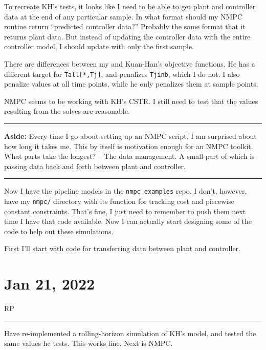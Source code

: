 \documentclass{article}
\newcommand{\RP}{\vspace{0.5cm}RP\vspace{0.2cm}\hrule\vspace{0.2cm}}
\begin{document}
To recreate KH's tests, it looks like I need to be able to get plant
and controller data at the end of any particular sample.
In what format should my NMPC routine return ``predicted controller data?''
Probably the same format that it returns plant data. But instead of updating
the controller data with the entire controller model, I should update
with only the first sample.

\medskip

There are differences between my and Kuan-Han's objective functions.
He has a different target for \texttt{Tall[*,Tj]}, and penalizes
\texttt{Tjinb}, which I do not.
I also penalize values at all time points, while he only penalizes
them at sample points.

\medskip

NMPC seems to be working with KH's CSTR. I still need to test that the values
resulting from the solves are reasonable.

\vspace{0.5cm}\hrule\vspace{0.2cm}

\textbf{Aside:} Every time I go about setting up an NMPC script, I am surprised
about how long it takes me. This by itself is motivation enough for an NMPC
toolkit.
What parts take the longest? -- The data management. A small part of which is
passing data back and forth between plant and controller.

\vspace{0.2cm}\hrule\vspace{0.5cm}

Now I have the pipeline models in the \texttt{nmpc\_examples} repo.
I don't, however, have my \texttt{nmpc/} directory with its function
for tracking cost and piecewise constant constraints.
That's fine, I just need to remember to push them next time I have that code
available. Now I can actually start designing some of the code to help
out these simulations.

\medskip

First I'll start with code for transferring data between plant and controller.

\section{Jan 21, 2022}

\RP
Have re-implemented a rolling-horizon simulation of KH's model,
and tested the same values he tests. This works fine. Next is NMPC.
\end{document}
